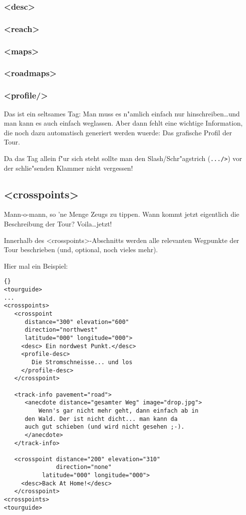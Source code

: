 \subsubsection{<desc>}
\subsubsection{<reach>}
\subsubsection{<maps>}
\subsubsection{<roadmaps>}

\subsubsection{<profile/>}
Das ist ein seltsames Tag: Man muss es n"amlich einfach nur
hinschreiben\ldots und man kann es auch einfach weglassen. Aber
dann fehlt eine wichtige Information, die noch dazu automatisch
generiert werden wuerde: Das grafische Profil der Tour.

Da das Tag allein f"ur sich steht sollte man den Slash/Schr"agstrich
(\texttt{.../>}) vor der schlie"senden Klammer nicht vergessen!

\subsection{<crosspoints>}
Mann-o-mann, so 'ne Menge Zeugs zu tippen. Wann kommt jetzt
eigentlich die Beschreibung der Tour? Voila\ldots jetzt!

Innerhalb des <crosspoints>-Abschnitts werden alle relevanten
Wegpunkte der Tour beschrieben (und, optional, noch vieles
mehr).

Hier mal ein Beispiel:
\begin{lstlisting}{}
<tourguide>
...
<crosspoints>
   <crosspoint 
      distance="300" elevation="600" 
      direction="northwest" 
      latitude="000" longitude="000">
     <desc> Ein nordwest Punkt.</desc>
     <profile-desc>
        Die Stromschneisse... und los
     </profile-desc>
   </crosspoint>
   
   <track-info pavement="road">
      <anecdote distance="gesamter Weg" image="drop.jpg">
          Wenn's gar nicht mehr geht, dann einfach ab in 
	  den Wald. Der ist nicht dicht... man kann da 
	  auch gut schieben (und wird nicht gesehen ;-).
      </anecdote>
   </track-info>
   
   <crosspoint distance="200" elevation="310" 
               direction="none" 
	       latitude="000" longitude="000">
     <desc>Back At Home!</desc>
   </crosspoint>
<crosspoints>
<tourguide>
\end{lstlisting}

